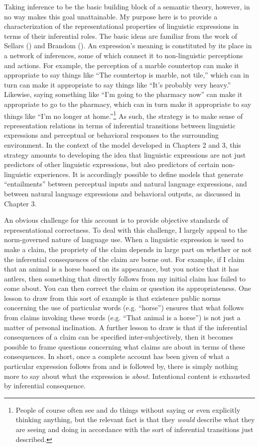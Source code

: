 Taking inference to be the basic building block of a semantic theory, however, in no way makes this goal unattainable. My purpose here is to provide a characterization of the representational properties of linguistic expressions in terms of their inferential roles. The basic ideas are familiar from the work of Sellars (\citeyear{Sellars:1953}) and Brandom (\citeyear{Brandom:2000,Brandom:1994}). An expression's meaning is constituted by its place in a network of inferences, some of which connect it to non-linguistic perceptions and actions. For example, the perception of a marble countertop can make it appropriate to say things like ``The countertop is marble, not tile,'' which can in turn can make it appropriate to say things like ``It's probably very heavy.'' Likewise, saying something like ``I'm going to the pharmacy now'' can make it appropriate to go to the pharmacy, which can in turn make it appropriate to say things like ``I'm no longer at home.''\footnote{People of course often see and do things without saying or even explicitly thinking anything, but the relevant fact is that they \textit{would} describe what they are seeing and doing in accordance with the sort of inferential transitions just described.} As such, the strategy is to make sense of representation relations in terms of inferential transitions between linguistic expressions and perceptual or behavioral responses to the surrounding environment. In the context of the model developed in Chapters 2 and 3, this strategy amounts to developing the idea that linguistic expressions are not just predictors of other linguistic expressions, but also predictors of certain non-linguistic experiences. It is accordingly possible to define models that generate ``entailments'' between perceptual inputs and natural language expressions, and between natural language expressions and behavioral outputs, as discussed in Chapter 3. 

An obvious challenge for this account is to provide objective standards of representational correctness. To deal with this challenge, I largely appeal to the norm-governed nature of language use. When a linguistic expression is used to make a claim, the propriety of the claim depends in large part on whether or not the inferential consequences of the claim are borne out. For example, if I claim that an animal is a horse based on its appearance, but you notice that it has antlers, then something that directly follows from my initial claim has failed to come about. You can then correct the claim or question its appropriateness. One lesson to draw from this sort of example is that existence public norms concerning the use of particular words (e.g. ``horse'') ensures that what follows from claims invoking these words (e.g. ``That animal is a horse'') is not just a matter of personal inclination. A further lesson to draw is that if the inferential consequences of a claim can be specified inter-subjectively, then it becomes possible to frame questions concerning what claims are about in terms of these consequences. In short, once a complete account has been given of what a particular expression follows from and is followed by, there is simply nothing more to say about what the expression is \textit{about}. Intentional content is exhausted by inferential consequence. 


